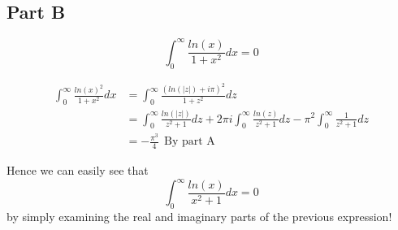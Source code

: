 \documentclass[10pt,a4paper]{article}
\begin{document}
	\subsection{Part B}
	$$\int_0^\infty \frac{ln(x)}{1+x^2}dx = 0 $$
	
	\begin{equation}
	\nonumber
	\begin{split}
		\int_0^\infty \frac{ln(x)^2}{1+x^2}dx &= \int_0^\infty \frac{(ln(|z|)+i\pi)^2}{1+z^2}dz \\
		&= \int_0^\infty \frac{ln(|z|)}{z^2+1}dz+2\pi i\int_{0}^{\infty}\frac{ln(z)}{z^2+1} dz -\pi^2\int_0^\infty\frac{1}{z^2+1}dz\\
		&= -\frac{\pi^3}{4} \ \ \text{By part A}
	\end{split}
	\end{equation}
	
	Hence we can easily see that $$\int_0^\infty \frac{ln(x)}{x^2+1}dx = 0 $$
	by simply examining the real and imaginary parts of the previous expression!
	
	
	
	
	
	
	
	
	
	
	
	
	
\end{document}
